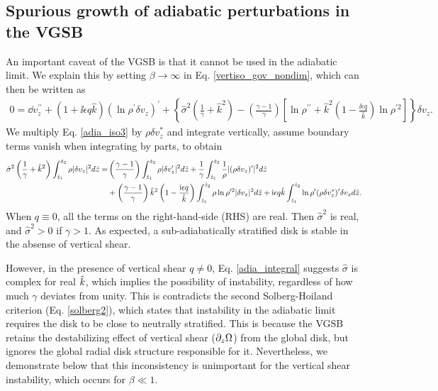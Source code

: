 \subsection{Spurious growth of adiabatic perturbations in the VGSB}\label{analytic_adia} 
An important caveat of the VGSB is that it cannot be used in the
adiabatic limit. We explain this by setting  $\beta\to\infty$ in
Eq. \ref{vertiso_gov_nondim}, which can then be written as 
\begin{align}
  0 =\dd v_z^{\prime\prime} + \left(1 + \ii \epsilon q
    \hat{k}\right)\left(\ln\rho^{\prime}\delta v_z\right)^\prime
  +\left\{\hat{\sigma}^2\left(\frac{1}{\gamma}+\hat{k}^2\right) 
    -\left(\frac{\gamma-1}{\gamma}\right)\left[\ln\rho^{\prime\prime}+\hat{k}^2\left(1-\frac{\ii\epsilon  
          q}{\hat{k}}\right)\ln\rho^{\prime 2}\right]\right\}\delta v_z.\label{adia_iso3}
\end{align}
We multiply Eq. \ref{adia_iso3} by $\rho\delta v_z^*$ and
integrate vertically, assume boundary terms vanish when integrating by
parts, to obtain
\begin{align}
  \hat{\sigma}^2\left(\frac{1}{\gamma} +
    \hat{k}^2\right)\int_{\hat{z}_1}^{\hat{z}_2}\rho|\delta
  v_z|^2 d\hat{z} 
  =&  \left(\frac{\gamma-1}{\gamma}\right)
  \int_{\hat{z}_1}^{\hat{z}_2}\rho|\delta v_z^\prime|^2 d\hat{z}
  +\frac{1}{\gamma}\int_{\hat{z}_1}^{\hat{z}_2}\frac{1}{\rho}|(\rho\delta
  v_z)^\prime|^2 d\hat{z}\notag\\
&+
  \left(\frac{\gamma-1}{\gamma}\right)\hat{k}^2\left(1-\frac{\mathrm{i}\epsilon
      q}{\hat{k}}\right) \int_{\hat{z}_1}^{\hat{z}_2}\rho\ln\rho^{\prime
    2}|\delta v_z|^2 d\hat{z}
+ \mathrm{i}\epsilon q \hat{k}
  \int_{\hat{z}_1}^{\hat{z}_2}\ln\rho^\prime(\rho\delta v_z^*)^\prime
  \delta v_z d\hat{z}.\label{adia_integral}
\end{align}
When $q\equiv0$, all the terms on the right-hand-side (RHS) are real. Then
$\hat{\sigma}^2$ is real, and  $\hat{\sigma}^2>0$ if $\gamma>1$. As
expected, a sub-adiabatically stratified disk is stable in the absense
of vertical shear. 

However, in the presence of vertical shear $q\neq0$,
Eq. \ref{adia_integral} suggests $\hat{\sigma}$ is complex for real
$\hat{k}$, which implies the possibility of instability, regardless of
how much $\gamma$ deviates from unity. This is contradicts the second 
Solberg-Hoiland criterion (Eq. \ref{solberg2}), which states that
instability in the adiabatic limit requires the disk to be close to
neutrally stratified. %
This is because the VGSB retains the destabilizing effect of vertical shear
($\partial_z\Omega$) from the global disk, but ignores the global radial disk
structure responsible for it. Nevertheless, we demonstrate below that
this inconsistency is unimportant for the vertical shear instability,
which occurs for $\beta\ll1$. 

